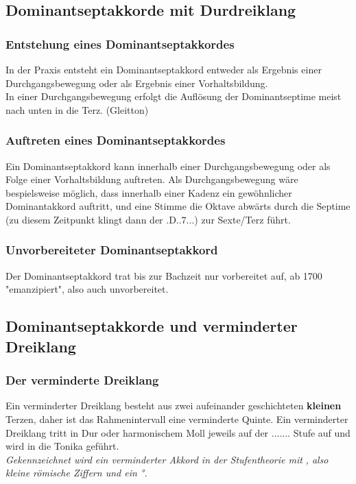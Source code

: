 \documentclass[a4paper]{article}
\newcommand{\dS}[1]{\HH.\uppercase\expandafter{\romannumeral #1\relax}.....} %
\newcommand{\vermStufe}[1]{\textbf{\romannumeral #1\textdegree}} %
\newcommand{\Dhoch}[2]{\HH.D.#2.#1...}
\begin{document}
	\subsection{Dominantseptakkorde mit Durdreiklang}
	\subsubsection{Entstehung eines Dominantseptakkordes}
	In der Praxis entsteht ein Dominantseptakkord entweder als Ergebnis einer Durchgangsbewegung oder als Ergebnis einer Vorhaltsbildung.\\
	In einer Durchgangsbewegung erfolgt die Auflösung der Dominantseptime meist nach unten in die Terz. (Gleitton)
	
	\subsubsection{Auftreten eines Dominantseptakkordes}
	Ein Dominantseptakkord kann innerhalb einer Durchgangsbewegung oder als Folge einer Vorhaltsbildung auftreten. Als Durchgangsbewegung wäre bespielsweise möglich, dass innerhalb einer Kadenz ein gewöhnlicher Dominantakkord auftritt, und eine Stimme die Oktave abwärts durch die Septime (zu diesem Zeitpunkt klingt dann der \Dhoch{7}{}) zur Sexte/Terz führt.
	
	\subsubsection{Unvorbereiteter Dominantseptakkord}
	Der Dominantseptakkord trat bis zur Bachzeit nur vorbereitet auf, ab 1700 "{}emanzipiert", also auch unvorbereitet. 
	
	\subsection{Dominantseptakkorde und verminderter Dreiklang}
	\subsubsection{Der verminderte Dreiklang}
	Ein verminderter Dreiklang besteht aus zwei aufeinander geschichteten \textbf{kleinen} Terzen, daher ist das Rahmenintervall eine verminderte Quinte. Ein verminderter Dreiklang tritt in Dur oder harmonischem Moll jeweils auf der \dS{7}. Stufe auf und wird in die Tonika geführt.\\
	\textit{Gekennzeichnet wird ein verminderter Akkord in der Stufentheorie mit} \vermStufe{7}\textit{, also kleine römische Ziffern und ein °.} 
	
\end{document}
